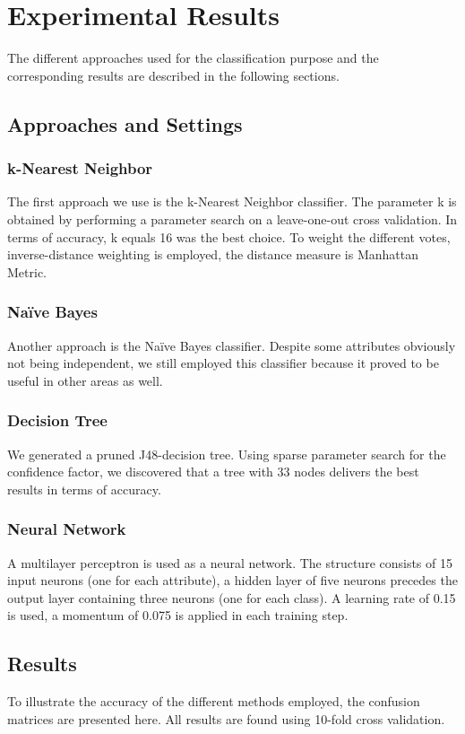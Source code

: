 \section{Experimental Results}
The different approaches used for the classification purpose and the corresponding results are described in the following sections. 
\subsection{Approaches and Settings}

\subsubsection*{k-Nearest Neighbor}
The first approach we use is the k-Nearest Neighbor classifier. The parameter k is obtained by performing a parameter search on a leave-one-out cross validation. In terms of accuracy, k equals 16 was the best choice. To weight the different votes, inverse-distance weighting is employed, the distance measure is Manhattan Metric. 

\subsubsection*{Na\"ive Bayes}
Another approach is the Na\"ive Bayes classifier. Despite some attributes obviously not being independent, we still employed this classifier because it proved to be useful in other areas as well.  

\subsubsection*{Decision Tree}
We generated a pruned J48-decision tree. Using sparse parameter search for the confidence factor, we discovered that a tree with 33 nodes delivers the best results in terms of accuracy.

\subsubsection{Neural Network}
A multilayer perceptron is used as a neural network. The structure consists of 15 input neurons (one for each attribute), a hidden layer of five neurons precedes the output layer containing three neurons (one for each class). A learning rate of 0.15 is used, a momentum of 0.075 is applied in each training step. 

\subsection{Results}
To illustrate the accuracy of the different methods employed, the confusion matrices are presented here. All results are found using 10-fold cross validation.

